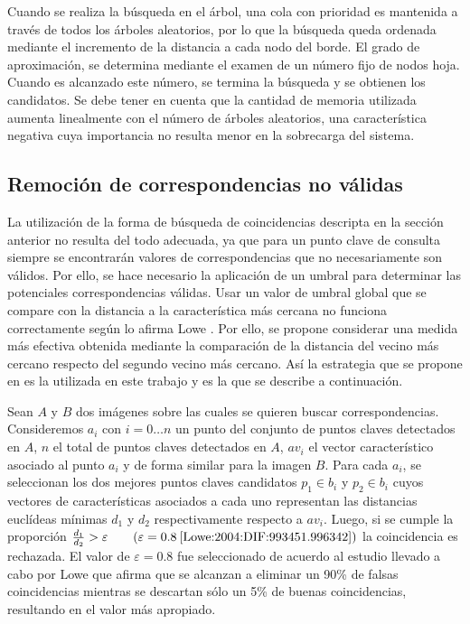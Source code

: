 Cuando se realiza la b\'usqueda en el árbol, una cola con prioridad es mantenida a través de todos los árboles aleatorios, por lo que la búsqueda queda ordenada mediante el incremento de la distancia a cada nodo del borde. 
El grado de aproximación, se determina mediante el examen de un número fijo de nodos hoja. Cuando es alcanzado este número, se termina la búsqueda y se obtienen los candidatos. 
Se debe tener en cuenta que la cantidad de memoria utilizada aumenta linealmente con el número de árboles aleatorios, una característica negativa cuya importancia no resulta menor en la sobrecarga del sistema.

\subsection{Remoción de correspondencias no válidas}
\label{sec:remocion_corresp_invalidas}
La utilización de la forma de búsqueda de coincidencias descripta en la sección anterior no resulta del todo adecuada, ya que para un punto clave de consulta siempre se encontrarán valores de correspondencias que no necesariamente son válidos. Por ello, se hace necesario la aplicación de un umbral para determinar las potenciales correspondencias válidas. Usar un valor de umbral global que se compare con la distancia a la característica más cercana no funciona correctamente
según lo afirma Lowe \cite{Lowe:2004:DIF:993451.996342}. Por ello, se propone considerar una medida más efectiva obtenida mediante la comparación de la distancia del vecino más cercano respecto del segundo vecino más cercano. Así la estrategia que se propone en \cite{Lowe:2004:DIF:993451.996342} es la utilizada en este trabajo y es la que se describe a continuación.

Sean $A$ y $B$ dos imágenes sobre las cuales se quieren buscar correspondencias. Consideremos $a_i$ con $i=0\ldots n$ un punto del conjunto de puntos claves detectados en $A$, $n$ el total de puntos claves detectados en $A$, $av_i$ el vector característico asociado al punto $a_i$ y de forma similar para la imagen $B$. Para cada $a_i$, se seleccionan los dos mejores puntos claves candidatos $p_1 \in b_i$ y $p_2 \in b_i$ cuyos vectores de características asociados a cada uno representan las distancias euclídeas mínimas $d_1$ y $d_2$ respectivamente respecto a $av_i$. Luego, si se cumple la proporción $\frac{d_{1}}{d_{2}}>\varepsilon\qquad(\varepsilon=0.8\:\cite{Lowe:2004:DIF:993451.996342})$ la coincidencia es rechazada.
El valor de $\varepsilon=0.8$ fue seleccionado de acuerdo al estudio llevado a cabo por Lowe \cite{Lowe:2004:DIF:993451.996342} que afirma que se alcanzan a eliminar un 90\% de falsas coincidencias mientras se descartan sólo un 5\% de buenas coincidencias, resultando en el valor más apropiado. %

